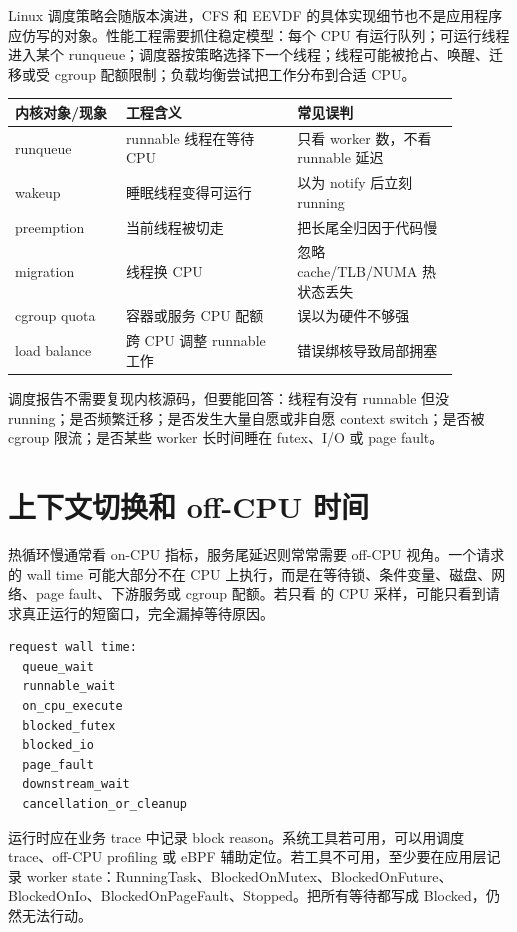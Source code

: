 Linux 调度策略会随版本演进，CFS 和 EEVDF 的具体实现细节也不是应用程序应仿写的对象。性能工程需要抓住稳定模型：每个 CPU 有运行队列；可运行线程进入某个 runqueue；调度器按策略选择下一个线程；线程可能被抢占、唤醒、迁移或受 cgroup 配额限制；负载均衡尝试把工作分布到合适 CPU。

\begin{center}
\small
\begin{tabular}{p{0.22\linewidth}p{0.34\linewidth}p{0.32\linewidth}}
\toprule
内核对象/现象 & 工程含义 & 常见误判 \\
\midrule
runqueue & runnable 线程在等待 CPU & 只看 worker 数，不看 runnable 延迟 \\
wakeup & 睡眠线程变得可运行 & 以为 notify 后立刻 running \\
preemption & 当前线程被切走 & 把长尾全归因于代码慢 \\
migration & 线程换 CPU & 忽略 cache/TLB/NUMA 热状态丢失 \\
cgroup quota & 容器或服务 CPU 配额 & 误以为硬件不够强 \\
load balance & 跨 CPU 调整 runnable 工作 & 错误绑核导致局部拥塞 \\
\bottomrule
\end{tabular}
\end{center}

调度报告不需要复现内核源码，但要能回答：线程有没有 runnable 但没 running；是否频繁迁移；是否发生大量自愿或非自愿 context switch；是否被 cgroup 限流；是否某些 worker 长时间睡在 futex、I/O 或 page fault。

\section{上下文切换和 off-CPU 时间}

热循环慢通常看 on-CPU 指标，服务尾延迟则常常需要 off-CPU 视角。一个请求的 wall time 可能大部分不在 CPU 上执行，而是在等待锁、条件变量、磁盘、网络、page fault、下游服务或 cgroup 配额。若只看  的 CPU 采样，可能只看到请求真正运行的短窗口，完全漏掉等待原因。

\begin{lstlisting}[numbers=none,caption={请求延迟分解}]
request wall time:
  queue_wait
  runnable_wait
  on_cpu_execute
  blocked_futex
  blocked_io
  page_fault
  downstream_wait
  cancellation_or_cleanup
\end{lstlisting}

运行时应在业务 trace 中记录 block reason。系统工具若可用，可以用调度 trace、off-CPU profiling 或 eBPF 辅助定位。若工具不可用，至少要在应用层记录 worker state：RunningTask、BlockedOnMutex、BlockedOnFuture、BlockedOnIo、BlockedOnPageFault、Stopped。把所有等待都写成 Blocked，仍然无法行动。


